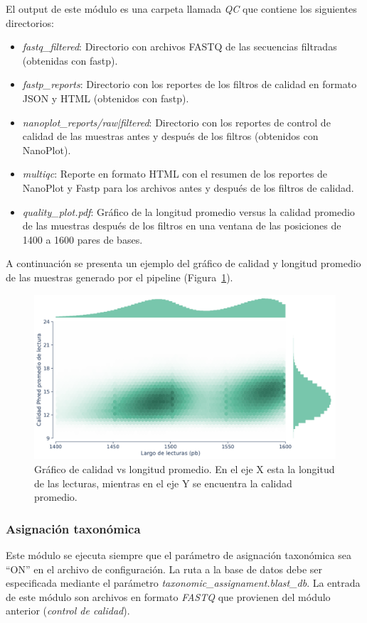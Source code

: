 El output de este módulo es una carpeta llamada \textit{QC} que contiene los siguientes directorios:
\begin{itemize}
    \item \textit{fastq\_filtered}: Directorio con archivos FASTQ de las secuencias filtradas (obtenidas con fastp).
    \item \textit{fastp\_reports}: Directorio con los reportes de los filtros de calidad en formato JSON y HTML (obtenidos con fastp).
    \item \textit{nanoplot\_reports/raw|filtered}: Directorio con los reportes de control de calidad de las muestras antes y después de los filtros (obtenidos con NanoPlot).
    \item \textit{multiqc}: Reporte en formato HTML con el resumen de los reportes de NanoPlot y Fastp para los archivos antes y después de los filtros de calidad.
    \item \textit{quality\_plot.pdf}: Gráfico de la longitud promedio versus la calidad promedio de las muestras después de los filtros en una ventana de las posiciones de 1400 a 1600 pares de bases.
\end{itemize}

A continuación se presenta un ejemplo del gráfico de calidad y longitud promedio de las muestras generado por el pipeline (Figura~\ref{fig:pipeline-quality-plot}).
\begin{figure}[H]
    \centering
    \includegraphics[width=0.85\linewidth]{images/pipeline/quality_plot.pdf}
    \caption{Gráfico de calidad vs longitud promedio. En el eje X esta la longitud de las lecturas, mientras en el eje Y se encuentra la calidad promedio.}
    \label{fig:pipeline-quality-plot}
\end{figure}
\subsubsection{Asignación taxonómica}
Este módulo se ejecuta siempre que el parámetro de asignación taxonómica sea ``ON'' en el archivo de configuración. 
La ruta a la base de datos debe ser especificada mediante el parámetro \textit{taxonomic\_assignament.blast\_db}.
La entrada de este módulo son archivos en formato \textit{FASTQ} que provienen del módulo anterior (\textit{control de calidad}).

